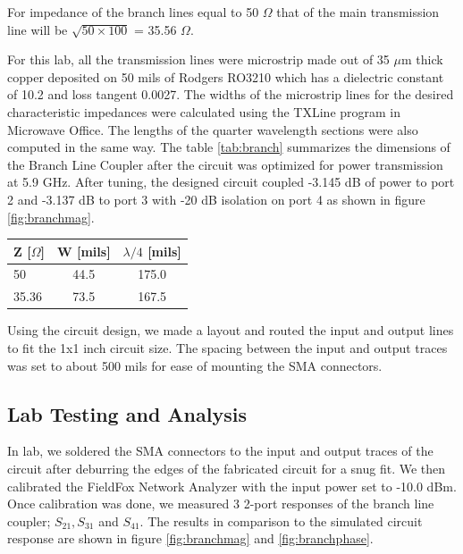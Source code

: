 \documentclass[twocolumn, aps, apl]{revtex4-1}
\begin{document}
For impedance of the branch lines equal to 50 $\Omega$ that of the main transmission line will be $\sqrt{50 \times 100}$ = 35.56 $\Omega$. 

For this lab, all the transmission lines were microstrip made out of 35 $\mu$m thick copper deposited on 50 mils of Rodgers RO3210 which has a dielectric constant of 10.2 and loss tangent 0.0027. The widths of the microstrip lines for the desired characteristic impedances were calculated using the TXLine program in Microwave Office. The lengths of the quarter wavelength sections were also computed in the same way. The table \ref{tab:branch} summarizes the dimensions of the Branch Line Coupler after the circuit was optimized for power transmission at 5.9 GHz. After tuning, the designed circuit coupled -3.145 dB of power to port 2 and -3.137 dB to port 3 with -20 dB isolation on port 4 as shown in figure \ref{fig:branchmag}.

\begin{tabular}{l | c | c}
    \hline
    Z [$\Omega$] & W [mils] & $\lambda/4$ [mils] \\
    \hline
    50  & 44.5 & 175.0 \\
    35.36 & 73.5 & 167.5 \\
    \hline
\end{tabular}

Using the circuit design, we made a layout and routed the input and output lines to fit the 1x1 inch circuit size. The spacing between the input and output traces was set to about 500 mils for ease of mounting the SMA connectors. 

\subsection{Lab Testing and Analysis}
In lab, we soldered the SMA connectors to the input and output traces of the circuit after deburring the edges of the fabricated circuit for a snug fit. We then calibrated the FieldFox Network Analyzer with the input power set to -10.0 dBm. Once calibration was done, we measured 3 2-port responses of the branch line coupler; $S_{21}, S_{31}$ and $S_{41}$. The results in comparison to the simulated circuit response are shown in figure \ref{fig:branchmag} and \ref{fig:branchphase}. 
\end{document}
